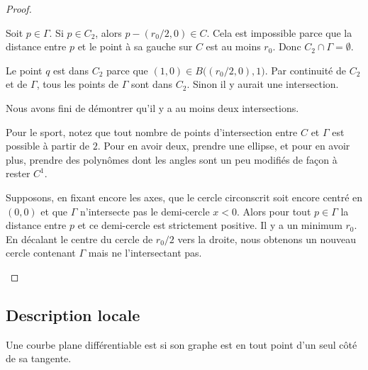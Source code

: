 \begin{proof}
\begin{subproof}
\begin{subproof}
			Soit \( p\in \Gamma\). Si \( p\in C_2\), alors \( p-(r_0/2,0)\in C\). Cela est impossible parce que la distance entre \( p\) et le point à sa gauche sur \( C\) est au moins \( r_0\). Donc \( C_2\cap \Gamma=\emptyset\).

			Le point \( q\) est dans \( C_2\) parce que \( (1,0)\in B\big( (r_0/2,0),1 \big)\). Par continuité de \( C_2\) et de \( \Gamma\), tous les points de \( \Gamma\) sont dans \( C_2\). Sinon il y aurait une intersection.

			Nous avons fini de démontrer qu'il y a au moins deux intersections.

			Pour le sport, notez que tout nombre de points d'intersection entre \( C\) et \( \Gamma\) est possible à partir de \( 2\). Pour en avoir deux, prendre une ellipse, et pour en avoir plus, prendre des polynômes dont les angles sont un peu modifiés de façon à rester \( C^1\).

		\end{subproof}


		Supposons, en fixant encore les axes, que le cercle circonscrit soit encore centré en \( (0,0)\) et que \( \Gamma\) n'intersecte pas le demi-cercle \( x<0\). Alors pour tout \( p\in \Gamma\) la distance entre \( p\) et ce demi-cercle est strictement positive. Il y a un minimum \( r_0\). En décalant le centre du cercle de \( r_0/2\) vers la droite, nous obtenons un nouveau cercle contenant \( \Gamma\) mais ne l'intersectant pas.
	\end{subproof}
\end{proof}

\subsection{Description locale}

\begin{definition}      \label{DEFooVQODooJSNYLw}
	Une courbe plane différentiable est  si son graphe est en tout point d'un seul côté de sa tangente.
\end{definition}


